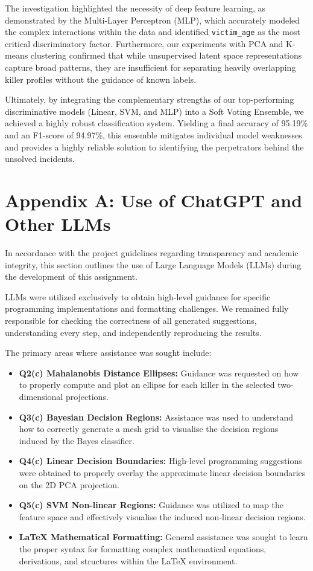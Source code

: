 \documentclass{article}
\begin{document}
The investigation highlighted the necessity of deep feature learning, as demonstrated by the Multi-Layer Perceptron (MLP), which accurately modeled the complex interactions within the data and identified \texttt{victim\_age} as the most critical discriminatory factor. Furthermore, our experiments with PCA and K-means clustering confirmed that while unsupervised latent space representations capture broad patterns, they are insufficient for separating heavily overlapping killer profiles without the guidance of known labels.

Ultimately, by integrating the complementary strengths of our top-performing discriminative models (Linear, SVM, and MLP) into a Soft Voting Ensemble, we achieved a highly robust classification system. Yielding a final accuracy of 95.19\% and an F1-score of 94.97\%, this ensemble mitigates individual model weaknesses and provides a highly reliable solution to identifying the perpetrators behind the unsolved incidents.

\newpage
\section*{Appendix A: Use of ChatGPT and Other LLMs}
In accordance with the project guidelines regarding transparency and academic integrity, this section outlines the use of Large Language Models (LLMs) during the development of this assignment.

LLMs were utilized exclusively to obtain high-level guidance for specific programming implementations and formatting challenges. We remained fully responsible for checking the correctness of all generated suggestions, understanding every step, and independently reproducing the results. 

The primary areas where assistance was sought include:
\begin{itemize}
    \item \textbf{Q2(c) Mahalanobis Distance Ellipses:} Guidance was requested on how to properly compute and plot an ellipse for each killer in the selected two-dimensional projections.
    \item \textbf{Q3(c) Bayesian Decision Regions:} Assistance was used to understand how to correctly generate a mesh grid to visualise the decision regions induced by the Bayes classifier.
    \item \textbf{Q4(c) Linear Decision Boundaries:} High-level programming suggestions were obtained to properly overlay the approximate linear decision boundaries on the 2D PCA projection.
    \item \textbf{Q5(c) SVM Non-linear Regions:} Guidance was utilized to map the feature space and effectively visualise the induced non-linear decision regions.
    \item \textbf{LaTeX Mathematical Formatting:} General assistance was sought to learn the proper syntax for formatting complex mathematical equations, derivations, and structures within the LaTeX environment.
\end{itemize}
\end{document}
